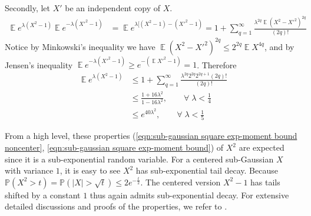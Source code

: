 \documentclass[12pt]{extarticle}
\newcommand{\field}[1]{\mathbb{#1}}
\newcommand{\1}{\field{1}}
\newcommand{\p}{\field{P}}
\DeclareMathOperator{\E}{\mathbb{E}}
\numberwithin{equation}{section}
\begin{document}
Secondly, let $X'$ be an independent copy of $X$.
\begin{align*}
    \E e^{\lambda (X^2 -1)} \E e^{-\lambda (X'^2 -1)} 
   & =  \E e^{\lambda [(X^2 -1)-(X'^2-1)} 
   = 1+\sum_{q=1}^{\infty} \frac{\lambda^{2q} \E (X^2-X'^2)^{2q}}{(2q)!}
\end{align*}
Notice  by Minkowski's inequality we have $\E (X^2-X'^2)^{2q}\le 2^{2q}\E X^{4q}$, and  by Jensen's inequality $ \E e^{-\lambda (X'^2 -1)} \ge e^{-(\E X'^2-1)}=1$. Therefore
\begin{align}\label{eqn:sub-gaussian square exp-moment bound}
    \E e^{\lambda (X^2 -1)} 
   & \le 1+ \sum_{q=1}^{\infty} \frac{\lambda^{2q} 2^{2q} 2^{2q+1} (2q)!}{(2q)!} \nonumber \\
   & \le \frac{1+16\lambda^2}{1-16\lambda^2} , \qquad \forall \; \lambda< \frac{1}{4}\nonumber \\
   & \le e^{40\lambda^2}, \qquad \forall \; \lambda< \frac{1}{5}
\end{align}

From a high level, these properties (\cref{eqn:sub-gaussian square exp-moment bound noncenter}, \cref{eqn:sub-gaussian square exp-moment bound}) of $X^2$  are expected since it is a sub-exponential random variable. For a centered sub-Gaussian $X$ with variance $1$, it is easy to see $X^2$ has sub-exponential tail decay. Because $\p(X^2> t)= \p( |X|>\sqrt{t}) \le 2 e^{-\frac{t}{2}}$. The centered version $X^2-1$ has tails shifted by a constant $1$ thus again admits sub-exponential decay.  For extensive detailed discussions and proofs of the properties, we refer to  \cite{boucheron2013concentration, vershynin2018high}.



\end{document}
